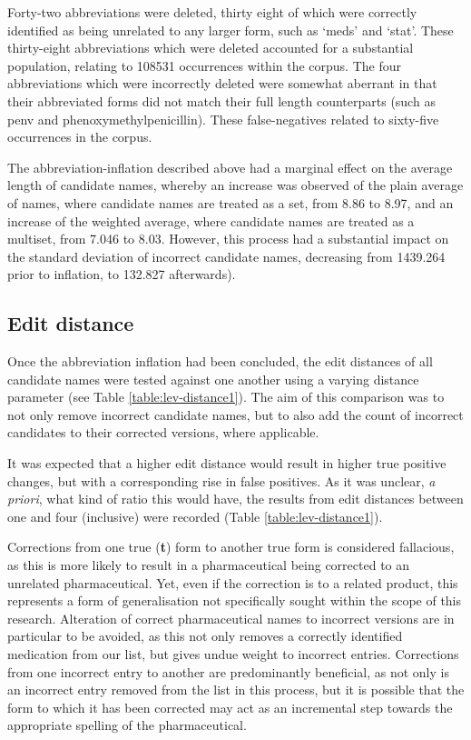 Forty-two abbreviations were deleted, thirty eight of which were correctly identified as being unrelated to any larger form, such as `meds' and `stat'. These thirty-eight abbreviations which were deleted accounted for a substantial population, relating to 108531 occurrences within the corpus. The four abbreviations which were incorrectly deleted were somewhat aberrant in that their abbreviated forms did not match their full length counterparts (such as penv and phenoxymethylpenicillin). These false-negatives related to sixty-five occurrences in the corpus.

The abbreviation-inflation described above had a marginal effect on the average length of candidate names, whereby an increase was observed of the plain average of names, where candidate names are treated as a set, from 8.86 to 8.97, and an increase of the weighted average, where candidate names are treated as a multiset, from 7.046 to 8.03. However, this process had a substantial impact on the standard deviation of incorrect candidate names, decreasing from 1439.264 prior to inflation, to 132.827 afterwards).

\subsection{Edit distance}
\label{section:medication-collection}

Once the abbreviation inflation had been concluded, the edit distances of all candidate names were tested against one another using a varying distance parameter (see Table \ref{table:lev-distance1}). The aim of this comparison was to not only remove incorrect candidate names, but to also add the count of incorrect candidates to their corrected versions, where applicable. 

It was expected that a higher edit distance would result in higher true positive changes, but with a corresponding rise in false positives. As it was unclear, \textit{a priori}, what kind of ratio this would have, the results from edit distances between one and four (inclusive) were recorded (Table \ref{table:lev-distance1}). 

Corrections from one true (\textbf{t}) form to another true form is considered fallacious, as this is more likely to result in a pharmaceutical being corrected to an unrelated pharmaceutical. Yet, even if the correction is to a related product, this represents a form of generalisation not specifically sought within the scope of this research. Alteration of correct pharmaceutical names to incorrect versions are in particular to be avoided, as this not only removes a correctly identified medication from our list, but gives undue weight to incorrect entries. Corrections from one incorrect entry to another are predominantly beneficial, as not only is an incorrect entry removed from the list in this process, but it is possible that the form to which it has been corrected may act as an incremental step towards the appropriate spelling of the pharmaceutical. 





